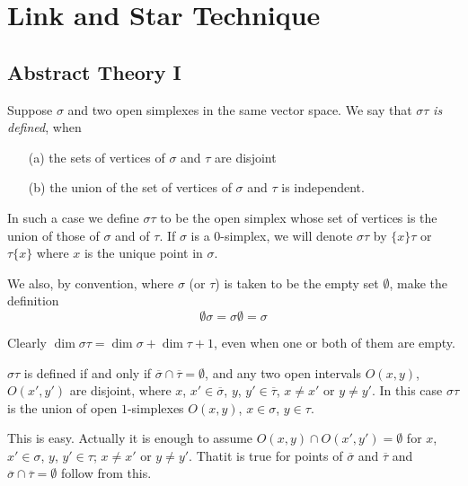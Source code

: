 
\chapter{Link and Star Technique}\label{chap4}

\section{Abstract Theory I}\pageoriginale\label{chap4-sec4.1}

\begin{definition}\label{chap4-defi4.1.1}
Suppose $\sigma$ and two open simplexes in the same vector space. We say that $\sigma\tau$ {\em is defined}, when
\begin{itemize}
\item[(a)] the sets of vertices of $\sigma$ and $\tau$ are disjoint

\item[(b)] the union of the set of vertices of $\sigma$ and $\tau$ is independent.
\end{itemize}
\end{definition}

In such a case we define $\sigma\tau$ to be the open simplex whose set of vertices is the union of those of $\sigma$ and of $\tau$. If $\sigma$ is a $0$-simplex, we will denote $\sigma\tau$ by $\{x\}\tau$ or $\tau\{x\}$ where $x$ is the unique point in $\sigma$.

We also, by convention, where $\sigma$ (or $\tau$) is taken to be the empty set $\emptyset$, make the definition
$$
\emptyset\sigma=\sigma\emptyset=\sigma
$$

Clearly $\dim \sigma\tau=\dim \sigma+\dim\tau+1$, even when one or both of them are empty.

\begin{ex}\label{chap4-ex4.1.2}
$\sigma \tau$ is defined if and only if $\overline{\sigma}\cap \overline{\tau}=\emptyset$, and any two open intervals $O(x,y)$, $O(x',y')$ are disjoint, where $x$, $x'\in\overline{\sigma}$, $y$, $y'\in \overline{\tau}$, $x\neq x'$ or $y\neq y'$. In this case $\sigma\tau$ is the union of open $1$-simplexes $O(x,y)$, $x\in \sigma$, $y\in \tau$.
\end{ex}

This is easy. Actually it is enough to assume $O(x,y)\cap O(x',y')=\emptyset$ for $x$, $x'\in\sigma$, $y$, $y'\in\tau$; $x\neq x'$ or $y\neq y'$. That\pageoriginale it is true for points of $\overline{\sigma}$ and $\overline{\tau}$ and $\overline{\sigma}\cap \overline{\tau}=\emptyset$ follow from this.

